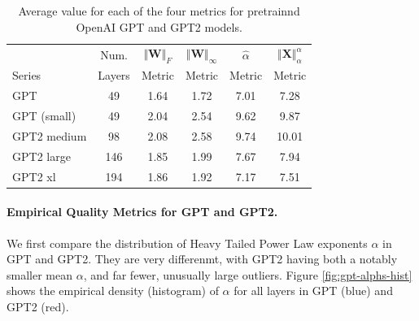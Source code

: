 
\begin{table}[t]
\small
\begin{center}
\begin{tabular}{|p{0.75in}|c|c|c|c|c|}
\hline
        & Num.   & $\Vert\mathbf{W}\Vert_{F}$ & $\Vert\mathbf{W}\Vert_{\infty}$ & $\hat{\alpha}$ & $\Vert\mathbf{X}\Vert^{\alpha}_{\alpha}$ \\
 Series & Layers & Metric                     & Metric                          & Metric         & Metric                                   \\
\hline
GPT & 49 & 1.64  & 1.72 & 7.01 & 7.28 \\
GPT (small) & 49 & 2.04  & 2.54& 9.62 & 9.87 \\
GPT2 medium & 98 & 2.08 & 2.58& 9.74 & 10.01 \\
GPT2 large & 146 & 1.85 & 1.99& 7.67 & 7.94 \\
GPT2 xl & 194 & 1.86 & 1.92 & 7.17 & 7.51 \\
\hline
\end{tabular}
\end{center}
\caption{Average value for each of the four metrics for pretrainnd OpenAI GPT and GPT2 models.}
\label{table:nlp}
\end{table}


\paragraph{Empirical Quality Metrics for GPT and GPT2.}

We first compare the distribution of  Heavy Tailed Power Law exponents $\alpha$ in GPT and GPT2.
They are very differenmt, with GPT2 having both a notably smaller mean $\alpha$, and far fewer, unusually large outliers.
Figure \ref{fig:gpt-alphs-hist} shows the empirical density (histogram) of $\alpha$
for all layers in GPT (blue) and GPT2 (red).  

